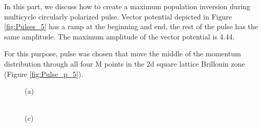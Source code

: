 In this part, we discuss how to create a maximum population inversion during multicycle circularly polarized pulse. Vector potential depicted in Figure \ref{fig:Pulses_5} has a ramp at the beginning and end, the rest of the pulse has the same amplitude. The maximum amplitude of the vector potential is 4.44.


For this purpose, pulse was chosen that move the middle of the momentum distribution through all four M points in the 2d square lattice Brillouin zone (Figure \ref{fig:Pulse_p_5}).






\begin{figure}[h!]
\begin{minipage}[h]{0.5\linewidth}
 (a) \\
\end{minipage}
\hfill
\begin{minipage}[h]{0.5\linewidth}
 \\(c)

\end{minipage}
\end{figure}
